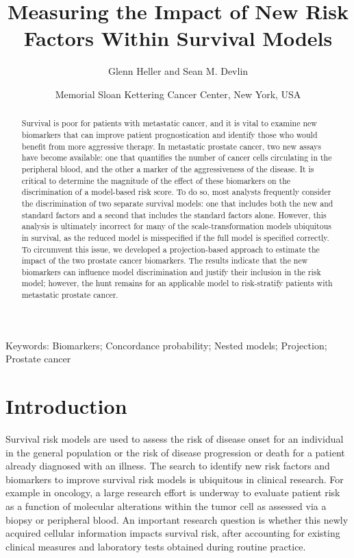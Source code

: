 \documentclass[12pt]{article}
\title{Measuring the Impact of New Risk Factors Within Survival Models}
\author{Glenn Heller and Sean M. Devlin}
\date{%
    Memorial Sloan Kettering Cancer Center, New York, USA\\[2ex]%
}
\begin{document}
\maketitle

\begin{abstract}

Survival is poor for patients with metastatic cancer, and it is vital to examine new biomarkers that can improve patient prognostication and identify those who would benefit from more aggressive therapy. In metastatic prostate cancer, two new assays have become available: one that quantifies the number of cancer cells circulating in the peripheral blood, and the other a marker of the aggressiveness of the disease. It is critical to determine the magnitude of the effect of these biomarkers on the discrimination of a model-based risk score. To do so, most analysts frequently consider the discrimination of two separate survival models: one that includes both the new and standard factors and a second that includes the standard factors alone. However, this analysis is ultimately incorrect for many of the scale-transformation models ubiquitous in survival, as the reduced model is misspecified if the full model is specified correctly. To circumvent this issue, we developed a projection-based approach to estimate the impact of the two prostate cancer biomarkers. The results indicate that the new biomarkers can influence model discrimination and justify their inclusion in the risk model; however, the hunt remains for an applicable model to risk-stratify patients with metastatic prostate cancer.
\end{abstract}

\bigskip

\noindent Keywords: Biomarkers; Concordance probability; Nested models; Projection; Prostate cancer  

\setcounter{page}{1}







\section{Introduction}  

Survival risk models are used to assess the risk of disease onset for an individual in the general population or the risk of disease progression or death for a patient already diagnosed with an illness.  The search to identify new risk factors and biomarkers to improve survival risk models is ubiquitous in clinical research.  For example in oncology, a large research effort is underway to evaluate patient risk as a function of molecular alterations within the tumor cell as assessed via a biopsy or peripheral blood.  An important research question is whether this newly acquired cellular information impacts survival risk, after accounting for existing clinical measures and laboratory tests obtained during routine practice.
\end{document}
